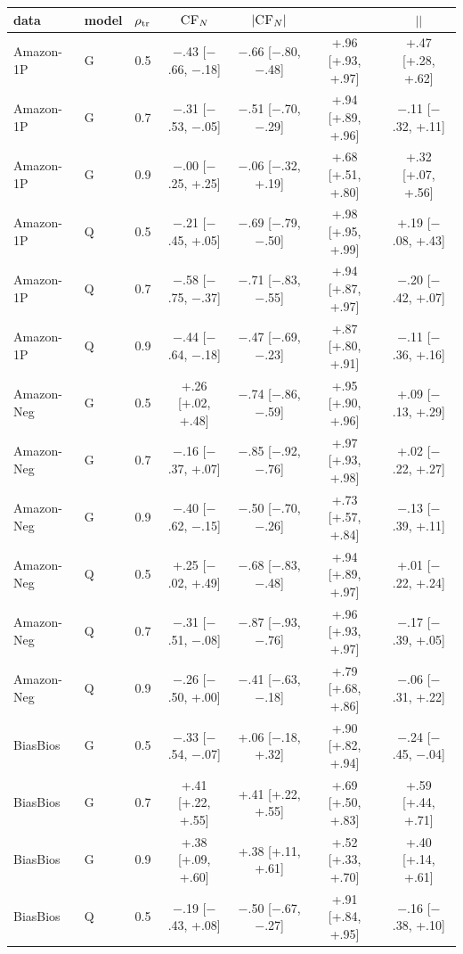 \begin{tabular}{@{}lllcccc@{}}
\toprule
data & model & $\rho_{\text{tr}}$ & $\textsc{CF}_{N}$ & $|\textsc{CF}_{N}|$ & \conf{} & $|$\leak{}$|$ \\
\midrule
Amazon-1P & G & 0.5 & $-$.43 [$-$.66, $-$.18] & $-$.66 [$-$.80, $-$.48] & +.96 [+.93, +.97] & +.47 [+.28, +.62] \\
Amazon-1P & G & 0.7 & $-$.31 [$-$.53, $-$.05] & $-$.51 [$-$.70, $-$.29] & +.94 [+.89, +.96] & $-$.11 [$-$.32, +.11] \\
Amazon-1P & G & 0.9 & $-$.00 [$-$.25, +.25] & $-$.06 [$-$.32, +.19] & +.68 [+.51, +.80] & +.32 [+.07, +.56] \\
Amazon-1P & Q & 0.5 & $-$.21 [$-$.45, +.05] & $-$.69 [$-$.79, $-$.50] & +.98 [+.95, +.99] & +.19 [$-$.08, +.43] \\
Amazon-1P & Q & 0.7 & $-$.58 [$-$.75, $-$.37] & $-$.71 [$-$.83, $-$.55] & +.94 [+.87, +.97] & $-$.20 [$-$.42, +.07] \\
Amazon-1P & Q & 0.9 & $-$.44 [$-$.64, $-$.18] & $-$.47 [$-$.69, $-$.23] & +.87 [+.80, +.91] & $-$.11 [$-$.36, +.16] \\
Amazon-Neg & G & 0.5 & +.26 [+.02, +.48] & $-$.74 [$-$.86, $-$.59] & +.95 [+.90, +.96] & +.09 [$-$.13, +.29] \\
Amazon-Neg & G & 0.7 & $-$.16 [$-$.37, +.07] & $-$.85 [$-$.92, $-$.76] & +.97 [+.93, +.98] & +.02 [$-$.22, +.27] \\
Amazon-Neg & G & 0.9 & $-$.40 [$-$.62, $-$.15] & $-$.50 [$-$.70, $-$.26] & +.73 [+.57, +.84] & $-$.13 [$-$.39, +.11] \\
Amazon-Neg & Q & 0.5 & +.25 [$-$.02, +.49] & $-$.68 [$-$.83, $-$.48] & +.94 [+.89, +.97] & +.01 [$-$.22, +.24] \\
Amazon-Neg & Q & 0.7 & $-$.31 [$-$.51, $-$.08] & $-$.87 [$-$.93, $-$.76] & +.96 [+.93, +.97] & $-$.17 [$-$.39, +.05] \\
Amazon-Neg & Q & 0.9 & $-$.26 [$-$.50, +.00] & $-$.41 [$-$.63, $-$.18] & +.79 [+.68, +.86] & $-$.06 [$-$.31, +.22] \\
BiasBios & G & 0.5 & $-$.33 [$-$.54, $-$.07] & +.06 [$-$.18, +.32] & +.90 [+.82, +.94] & $-$.24 [$-$.45, $-$.04] \\
BiasBios & G & 0.7 & +.41 [+.22, +.55] & +.41 [+.22, +.55] & +.69 [+.50, +.83] & +.59 [+.44, +.71] \\
BiasBios & G & 0.9 & +.38 [+.09, +.60] & +.38 [+.11, +.61] & +.52 [+.33, +.70] & +.40 [+.14, +.61] \\
BiasBios & Q & 0.5 & $-$.19 [$-$.43, +.08] & $-$.50 [$-$.67, $-$.27] & +.91 [+.84, +.95] & $-$.16 [$-$.38, +.10] \\

\end{tabular}
